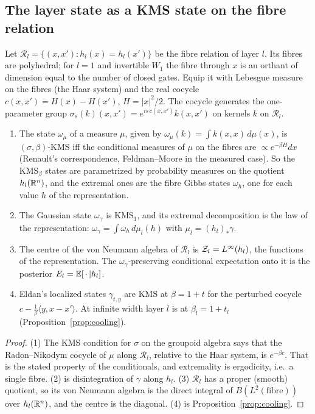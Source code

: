 \label{sec:modular}
\subsection{The layer state as a KMS state on the fibre relation}
Let $\mathcal R_l=\{(x,x'):h_l(x)=h_l(x')\}$ be the fibre relation of layer $l$. Its fibres are polyhedral; for $l=1$ and invertible $W_1$
the fibre through $x$ is an orthant of dimension equal to the number of closed gates. Equip it with Lebesgue measure on the fibres
(the Haar system) and the real cocycle $c(x,x')=H(x)-H(x')$, $H=|x|^2/2$. The cocycle generates the one-parameter group
$\sigma_s(k)(x,x')=e^{is\,c(x,x')}k(x,x')$ on kernels $k$ on $\mathcal R_l$.
\begin{proposition}\label{prop:kms}
\begin{enumerate}[leftmargin=*]
\item The state $\omega_\mu$ of a measure $\mu$, given by $\omega_\mu(k)=\int k(x,x)\,d\mu(x)$, is $(\sigma,\beta)$-KMS iff the conditional measures of $\mu$ on the fibres are
$\propto e^{-\beta H}dx$ (Renault's correspondence, Feldman--Moore in the measured case). So the KMS$_\beta$ states are parametrized by
probability measures on the quotient $h_l(\mathbb R^n)$, and the extremal ones are the fibre Gibbs states $\omega_h$, one for each value $h$
of the representation.
\item The Gaussian state $\omega_\gamma$ is KMS$_1$, and its extremal decomposition is the law of the representation:
$\omega_\gamma=\int\omega_h\,d\mu_l(h)$ with $\mu_l=(h_l)_*\gamma$.
\item The centre of the von Neumann algebra of $\mathcal R_l$ is $\mathcal Z_l=L^\infty(h_l)$, the functions of the representation. The
$\omega_\gamma$-preserving conditional expectation onto it is the posterior $E_l=\mathbb E[\,\cdot\,|h_l]$.
\item Eldan's localized states $\gamma_{t,y}$ are KMS at $\beta=1+t$ for the perturbed cocycle $c-\frac1\beta\langle y,x-x'\rangle$. At infinite
width layer $l$ is at $\beta_l=1+t_l$ (Proposition~\ref{prop:cooling}).
\end{enumerate}
\end{proposition}
\begin{proof}
(1) The KMS condition for $\sigma$ on the groupoid algebra says that the Radon--Nikodym cocycle of $\mu$ along $\mathcal R_l$, relative to the
Haar system, is $e^{-\beta c}$. That is the stated property of the conditionals, and extremality is ergodicity, i.e.\ a single fibre.
(2) is disintegration of $\gamma$ along $h_l$. (3) $\mathcal R_l$ has a proper (smooth) quotient, so its von Neumann algebra is the direct
integral of $B(L^2(\text{fibre}))$ over $h_l(\mathbb R^n)$, and the centre is the diagonal. (4) is Proposition~\ref{prop:cooling}.
\end{proof}
